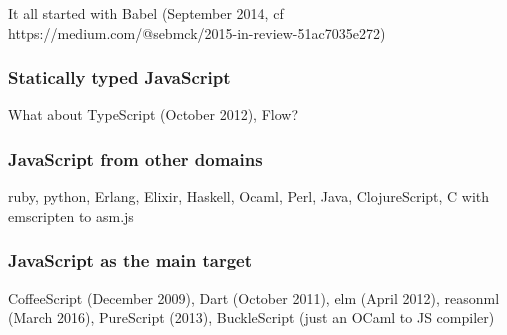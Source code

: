 It all started with Babel (September 2014,
cf https://medium.com/@sebmck/2015-in-review-51ac7035e272)

\subsubsection{Statically typed JavaScript}%
\label{ssub:statically_typed_javascript}

What about TypeScript (October 2012), Flow?

\subsubsection{JavaScript from other domains}%
\label{ssub:javascript_other_domains}

ruby, python, Erlang, Elixir, Haskell, Ocaml, Perl, Java, ClojureScript,
C with emscripten to asm.js

\subsubsection{JavaScript as the main target}%
\label{ssub:javascript_as_the_main_target}

CoffeeScript (December 2009), Dart (October 2011),
elm (April 2012), reasonml (March 2016), PureScript (2013),
BuckleScript (just an OCaml to JS compiler)
